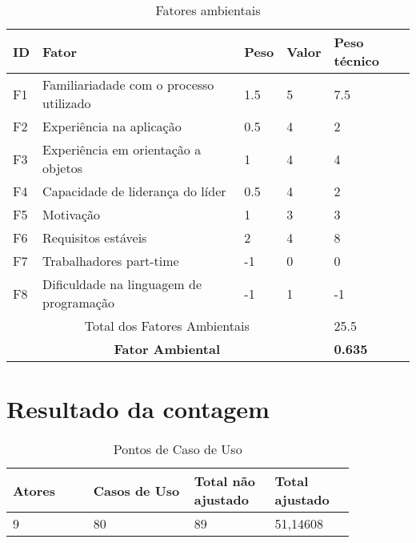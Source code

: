     \begin{table}[!h]
    \centering
    \caption{Fatores ambientais}
    \label{fatores_ambientais}
    \begin{tabular}{l|l|l|l|l}
    \hline
    ID  & Fator                                                          & Peso & Valor & Peso técnico\\
    \hline
    F1  & Familiariadade com o processo utilizado                        &  1.5  &  5  & 7.5  \\
    F2  & Experiência na aplicação                                       &  0.5  &  4  & 2  \\
    F3  & Experiência em orientação a objetos                            &   1   &  4  & 4  \\
    F4  & Capacidade de liderança do líder                               &  0.5  &  4  & 2  \\
    F5  & Motivação                                                      &   1   &  3  & 3  \\
    F6  & Requisitos estáveis                                            &   2   &  4  & 8  \\
    F7  & Trabalhadores part-time                                        &  -1   &  0  & 0  \\
    F8  & Dificuldade na linguagem de programação                        &  -1   &  1  & -1  \\
    \hline
    \multicolumn{4}{c}{Total dos Fatores Ambientais} & 25.5\\
    \hline
    \multicolumn{4}{c}{\textbf{Fator Ambiental}} & \textbf{0.635}\\
    \hline
    \end{tabular}
    \end{table}
  
\vfill
\pagebreak
\section{Resultado da contagem}

\begin{table*}[!h]
\centering
\caption{Pontos de Caso de Uso}
\label{Rotulo}
  \begin{tabular}{|p{0.20\linewidth}|p{0.25\linewidth}|p{0.20\linewidth}|p{0.20\linewidth}|}
  \hline
  \textbf{Atores} & \textbf{Casos de Uso} & \textbf{Total não ajustado} & \textbf{Total ajustado} \\ 
  \hline

  9 & 80 & 89 & 51,14608\\
  \hline
  \end{tabular}
\end{table*}